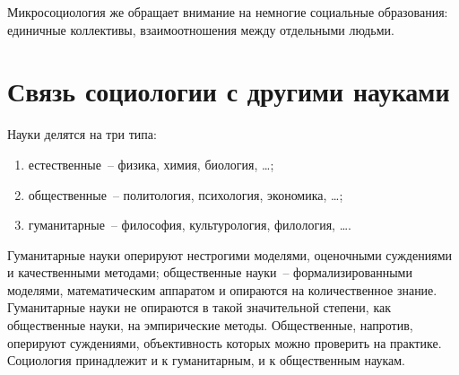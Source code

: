  Микросоциология же обращает внимание на немногие социальные образования:
  единичные коллективы, взаимоотношения между отдельными людьми.

\section{Связь социологии с другими науками}

  Науки делятся на три типа:
  \begin{enumerate}
    \item естественные~-- физика, химия, биология, \ldots;
    \item общественные~-- политология, психология, экономика, \ldots;
    \item гуманитарные~-- философия, культурология, филология, \ldots.
  \end{enumerate}

  Гуманитарные науки оперируют нестрогими моделями, оценочными суждениями и
  качественными методами; общественные науки~-- формализированными моделями,
  математическим аппаратом и опираются на количественное знание. Гуманитарные
  науки не опираются в такой значительной степени, как общественные науки, на
  эмпирические методы. Общественные, напротив, оперируют суждениями,
  объективность которых можно проверить на практике. Социология принадлежит и к
  гуманитарным, и к общественным наукам.
